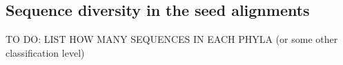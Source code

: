 \subsection{Sequence diversity in the seed alignments}

TO DO: LIST HOW MANY SEQUENCES IN EACH PHYLA (or some other classification level)










